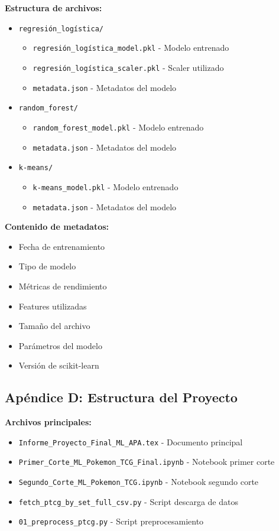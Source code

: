 \documentclass[12pt,letterpaper]{article}
\begin{document}
\textbf{Estructura de archivos:}
\begin{itemize}
    \item \texttt{regresión\_logística/}
    \begin{itemize}
        \item \texttt{regresión\_logística\_model.pkl} - Modelo entrenado
        \item \texttt{regresión\_logística\_scaler.pkl} - Scaler utilizado
        \item \texttt{metadata.json} - Metadatos del modelo
    \end{itemize}
    \item \texttt{random\_forest/}
    \begin{itemize}
        \item \texttt{random\_forest\_model.pkl} - Modelo entrenado
        \item \texttt{metadata.json} - Metadatos del modelo
    \end{itemize}
    \item \texttt{k-means/}
    \begin{itemize}
        \item \texttt{k-means\_model.pkl} - Modelo entrenado
        \item \texttt{metadata.json} - Metadatos del modelo
    \end{itemize}
\end{itemize}

\textbf{Contenido de metadatos:}
\begin{itemize}
    \item Fecha de entrenamiento
    \item Tipo de modelo
    \item Métricas de rendimiento
    \item Features utilizadas
    \item Tamaño del archivo
    \item Parámetros del modelo
    \item Versión de scikit-learn
\end{itemize}

\subsection{Apéndice D: Estructura del Proyecto}

\textbf{Archivos principales:}
\begin{itemize}
    \item \texttt{Informe\_Proyecto\_Final\_ML\_APA.tex} - Documento principal
    \item \texttt{Primer\_Corte\_ML\_Pokemon\_TCG\_Final.ipynb} - Notebook primer corte
    \item \texttt{Segundo\_Corte\_ML\_Pokemon\_TCG.ipynb} - Notebook segundo corte
    \item \texttt{fetch\_ptcg\_by\_set\_full\_csv.py} - Script descarga de datos
    \item \texttt{01\_preprocess\_ptcg.py} - Script preprocesamiento
\end{itemize}
\end{document}
